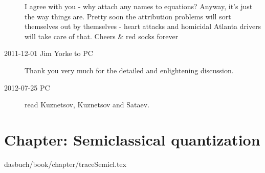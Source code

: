 \begin{description}
I agree with you - why attach any names to equations? Anyway, it's just
the way things are. Pretty soon the attribution problems will sort
themselves out by themselves - heart attacks and homicidal Atlanta
drivers will take care of that. Cheers \& red socks forever

\item[2011-12-01 Jim Yorke to PC] Thank you very much for the detailed
and enlightening discussion.

\item[2012-07-25 PC] read
Kuznetsov, Kuznetsov and Sataev.

\end{description}

%

%

%

\section{Chapter: Semiclassical quantization}
\label{c-traceSemicl}\noindent dasbuch/book/chapter/traceSemicl.tex

